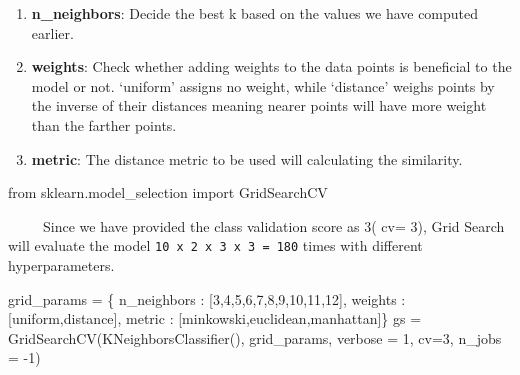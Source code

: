 \documentclass[
  letterpaper,
  DIV=11,
  numbers=noendperiod]{scrreprt}
\newenvironment{Shaded}{\begin{snugshade}}{\end{snugshade}}
\newcommand{\DecValTok}[1]{\textcolor[rgb]{0.68,0.00,0.00}{#1}}
\newcommand{\ImportTok}[1]{\textcolor[rgb]{0.00,0.46,0.62}{#1}}
\newcommand{\NormalTok}[1]{\textcolor[rgb]{0.00,0.23,0.31}{#1}}
\newcommand{\OperatorTok}[1]{\textcolor[rgb]{0.37,0.37,0.37}{#1}}
\newcommand{\StringTok}[1]{\textcolor[rgb]{0.13,0.47,0.30}{#1}}
\begin{document}
\begin{enumerate}
\def\labelenumi{\arabic{enumi}.}
\item
  \textbf{n\_neighbors}: Decide the best k based on the values we have
  computed earlier.
\item
  \textbf{weights}: Check whether adding weights to the data points is
  beneficial to the model or not. `uniform' assigns no weight, while
  `distance' weighs points by the inverse of their distances meaning
  nearer points will have more weight than the farther points.
\item
  \textbf{metric}: The distance metric to be used will calculating the
  similarity.
\end{enumerate}

\begin{Shaded}
\begin{Highlighting}[]
\ImportTok{from}\NormalTok{ sklearn.model\_selection }\ImportTok{import}\NormalTok{ GridSearchCV}
\end{Highlighting}
\end{Shaded}

~~~~~Since we have provided the class validation score as 3( cv= 3),
Grid Search will evaluate the model
\texttt{10\ x\ 2\ x\ 3\ x\ 3\ =\ 180} times with different
hyperparameters.

\begin{Shaded}
\begin{Highlighting}[]
\NormalTok{grid\_params }\OperatorTok{=}\NormalTok{ \{ }\StringTok{\textquotesingle{}n\_neighbors\textquotesingle{}}\NormalTok{ : [}\DecValTok{3}\NormalTok{,}\DecValTok{4}\NormalTok{,}\DecValTok{5}\NormalTok{,}\DecValTok{6}\NormalTok{,}\DecValTok{7}\NormalTok{,}\DecValTok{8}\NormalTok{,}\DecValTok{9}\NormalTok{,}\DecValTok{10}\NormalTok{,}\DecValTok{11}\NormalTok{,}\DecValTok{12}\NormalTok{],}
               \StringTok{\textquotesingle{}weights\textquotesingle{}}\NormalTok{ : [}\StringTok{\textquotesingle{}uniform\textquotesingle{}}\NormalTok{,}\StringTok{\textquotesingle{}distance\textquotesingle{}}\NormalTok{],}
               \StringTok{\textquotesingle{}metric\textquotesingle{}}\NormalTok{ : [}\StringTok{\textquotesingle{}minkowski\textquotesingle{}}\NormalTok{,}\StringTok{\textquotesingle{}euclidean\textquotesingle{}}\NormalTok{,}\StringTok{\textquotesingle{}manhattan\textquotesingle{}}\NormalTok{]\}}
\NormalTok{gs }\OperatorTok{=}\NormalTok{ GridSearchCV(KNeighborsClassifier(), grid\_params, verbose }\OperatorTok{=} \DecValTok{1}\NormalTok{, cv}\OperatorTok{=}\DecValTok{3}\NormalTok{, n\_jobs }\OperatorTok{=} \OperatorTok{{-}}\DecValTok{1}\NormalTok{)}
\end{Highlighting}
\end{Shaded}
\end{document}
